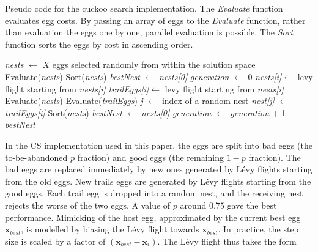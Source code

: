 \documentclass[a4paper, 5p, sort&compress]{elsarticle}%
\newcommand{\paren}[1]{\left(#1\right)}
\begin{document}
\begin{algorithm*}[t]
  \caption{Pseudo code for the cuckoo search implementation. The
    \textit{Evaluate} function evaluates egg costs. By passing an
    array of eggs to the \textit{Evaluate} function, rather than
    evaluation the eggs one by one, parallel evaluation is
    possible. The \textit{Sort} function sorts the eggs by cost in
    ascending order.}
  \label{csAlgo}
  \begin{algorithmic}
    \State \textit{nests} $\gets$ $X$ eggs selected randomly from within the
    solution space
    \State Evaluate(\textit{nests})
    \State Sort(\textit{nests})
    \State \textit{bestNest} $\gets$ \textit{nests[0]}
    \State \textit{generation} $\gets$ 0
    \State \textit{nests[i]}$\gets$ levy flight starting from \textit{nests[i]}
    \EndFor
    \State \textit{trailEggs[i]}$\gets$ levy flight starting from \textit{nests[i]}
    \EndFor
    \State Evaluate(\textit{nests})
    \State Evaluate(\textit{trailEggs})
    \State \textit{j} $\gets$ index of a random nest
    \State \textit{nest[j]} $\gets$ \textit{trailEggs[i]}
    \EndIf
    \EndFor
    \State Sort(\textit{nests})
    \State \textit{bestNest} $\gets$ \textit{nests[0]}
    \State \textit{generation} $\gets$ \textit{generation} + 1
    \EndWhile
    \State \Return \textit{bestNest}
    \EndFunction
  \end{algorithmic}
\end{algorithm*}


In the CS implementation used in this paper, the eggs are split into
bad eggs (the to-be-abandoned $p$ fraction) and good eggs (the
remaining $1-p$ fraction). The bad eggs are replaced immediately by
new ones generated by Lévy flights starting from the old eggs. New
trails eggs are generated by Lévy flights starting from the good
eggs. Each trail egg is dropped into a random nest, and the receiving
nest rejects the worse of the two eggs. A value of $p$ around $0.75$
gave the best performance. Mimicking of the host egg, approximated by
the current best egg $\boldsymbol x_{best}$, is modelled by biasing
the Lévy flight towards $\boldsymbol x_{best}$. In practice, the step
size is scaled by a factor of
$\paren{\boldsymbol x_{best}- \boldsymbol x_{i}}$. The Lévy flight
thus takes the form
\end{document}

